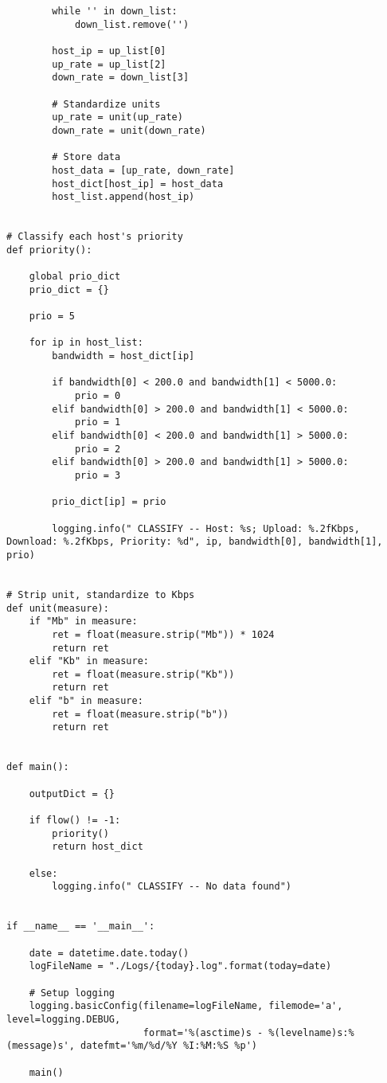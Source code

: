 \begin{verbatim}
        while '' in down_list:
            down_list.remove('')

        host_ip = up_list[0]
        up_rate = up_list[2]
        down_rate = down_list[3]

        # Standardize units
        up_rate = unit(up_rate)
        down_rate = unit(down_rate)

        # Store data
        host_data = [up_rate, down_rate]
        host_dict[host_ip] = host_data
        host_list.append(host_ip)


# Classify each host's priority
def priority():

    global prio_dict
    prio_dict = {}

    prio = 5

    for ip in host_list:
        bandwidth = host_dict[ip]

        if bandwidth[0] < 200.0 and bandwidth[1] < 5000.0:
            prio = 0
        elif bandwidth[0] > 200.0 and bandwidth[1] < 5000.0:
            prio = 1
        elif bandwidth[0] < 200.0 and bandwidth[1] > 5000.0:
            prio = 2
        elif bandwidth[0] > 200.0 and bandwidth[1] > 5000.0:
            prio = 3

        prio_dict[ip] = prio

        logging.info(" CLASSIFY -- Host: %s; Upload: %.2fKbps, Download: %.2fKbps, Priority: %d", ip, bandwidth[0], bandwidth[1], prio)


# Strip unit, standardize to Kbps
def unit(measure):
    if "Mb" in measure:
        ret = float(measure.strip("Mb")) * 1024
        return ret
    elif "Kb" in measure:
        ret = float(measure.strip("Kb"))
        return ret
    elif "b" in measure:
        ret = float(measure.strip("b"))
        return ret


def main():

    outputDict = {}

    if flow() != -1:
        priority()
        return host_dict

    else:
        logging.info(" CLASSIFY -- No data found")


if __name__ == '__main__':

    date = datetime.date.today()
    logFileName = "./Logs/{today}.log".format(today=date)

    # Setup logging
    logging.basicConfig(filename=logFileName, filemode='a', level=logging.DEBUG,
                        format='%(asctime)s - %(levelname)s:%(message)s', datefmt='%m/%d/%Y %I:%M:%S %p')

    main()
\end{verbatim}

